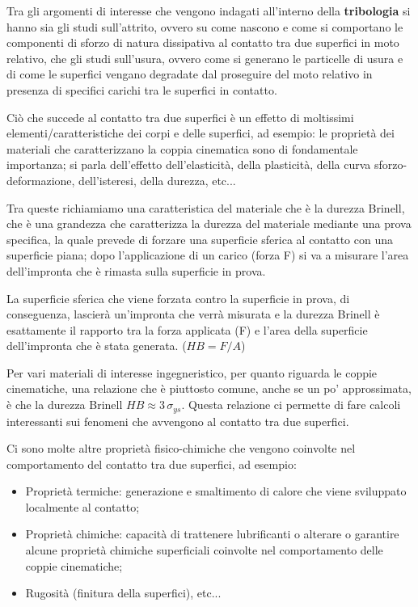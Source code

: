 Tra gli argomenti di interesse che vengono indagati all'interno della \textbf{tribologia} si hanno sia gli studi sull'attrito, ovvero su come nascono e come si comportano le componenti di sforzo di natura dissipativa al contatto tra due superfici in moto relativo, che gli studi sull'usura, ovvero come si generano le particelle di usura e di come le superfici vengano degradate dal proseguire del moto relativo in presenza di specifici carichi tra le superfici in contatto.

Ciò che succede al contatto tra due superfici è un effetto di moltissimi elementi/caratteristiche dei corpi e delle superfici, ad esempio: le proprietà dei materiali che caratterizzano la coppia cinematica sono di fondamentale importanza; si parla dell'effetto dell'elasticità, della plasticità, della curva sforzo-deformazione, dell'isteresi, della durezza, etc...

Tra queste richiamiamo una caratteristica del materiale che è la durezza Brinell, che è una grandezza che caratterizza la durezza del materiale mediante una prova specifica, la quale prevede di forzare una superficie sferica al contatto con una superficie piana; dopo l'applicazione di un carico (forza F) si va a misurare l'area dell'impronta che è rimasta sulla superficie in prova.

La superficie sferica che viene forzata contro la superficie in prova, di conseguenza, lascierà un'impronta che verrà misurata e la durezza Brinell è esattamente il rapporto tra la forza applicata (F) e l'area della superficie dell'impronta che è stata generata. ($HB = F/A$)

Per vari materiali di interesse ingegneristico, per quanto riguarda le coppie cinematiche, una relazione che è piuttosto comune, anche se un po' approssimata, è che la durezza Brinell $HB \approx 3\,\sigma_{ys}$. Questa relazione ci permette di fare calcoli interessanti sui fenomeni che avvengono al contatto tra due superfici.

Ci sono molte altre proprietà fisico-chimiche che vengono coinvolte nel comportamento del contatto tra due superfici, ad esempio:
\begin{itemize}
\item Proprietà termiche: generazione e smaltimento di calore che viene sviluppato localmente al contatto;
\item Proprietà chimiche: capacità di trattenere lubrificanti o alterare o garantire alcune proprietà chimiche superficiali coinvolte nel comportamento delle coppie cinematiche;
\item Rugosità (finitura della superfici), etc...
\end{itemize}

